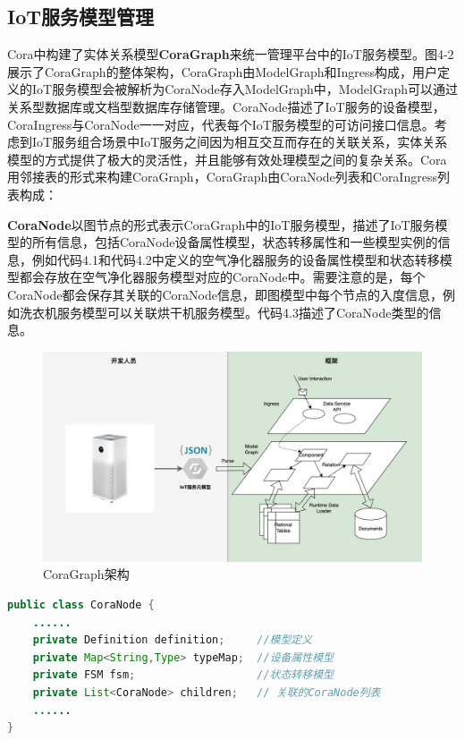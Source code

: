 \documentclass[winfonts,master,twoside]{njuthesis}
\begin{document}
\subsection{IoT服务模型管理}
Cora中构建了实体关系模型\textbf{CoraGraph}来统一管理平台中的IoT服务模型。图4-2展示了CoraGraph的整体架构，CoraGraph由ModelGraph和Ingress构成，用户定义的IoT服务模型会被解析为CoraNode存入ModelGraph中，ModelGraph可以通过关系型数据库或文档型数据库存储管理。CoraNode描述了IoT服务的设备模型，CoraIngress与CoraNode一一对应，代表每个IoT服务模型的可访问接口信息。考虑到IoT服务组合场景中IoT服务之间因为相互交互而存在的关联关系，实体关系模型的方式提供了极大的灵活性，并且能够有效处理模型之间的复杂关系。Cora用邻接表的形式来构建CoraGraph，CoraGraph由CoraNode列表和CoraIngress列表构成：

\textbf{CoraNode}以图节点的形式表示CoraGraph中的IoT服务模型，描述了IoT服务模型的所有信息，包括CoraNode设备属性模型，状态转移属性和一些模型实例的信息，例如代码4.1和代码4.2中定义的空气净化器服务的设备属性模型和状态转移模型都会存放在空气净化器服务模型对应的CoraNode中。需要注意的是，每个CoraNode都会保存其关联的CoraNode信息，即图模型中每个节点的入度信息，例如洗衣机服务模型可以关联烘干机服务模型。代码4.3描述了CoraNode类型的信息。

\begin{figure}
	\centering
	\includegraphics[width=1.0\textwidth]{figure/4-cora/CoraGraph.png}
	\caption{CoraGraph架构}
	\label{ontransact-impl}
\end{figure}

\begin{lstlisting}[caption={CoraNode类型信息},label={lst:CoraNode},language=java,basicstyle=\footnotesize]
public class CoraNode {
    ......
    private Definition definition;     //模型定义
    private Map<String,Type> typeMap;  //设备属性模型
    private FSM fsm;                   //状态转移模型
    private List<CoraNode> children;   // 关联的CoraNode列表
    ......
}
\end{lstlisting}
\end{document}
